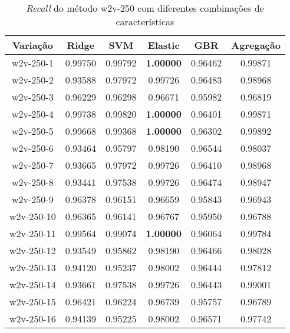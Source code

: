 \begin{table}[H]
\label{tab:recallw2v250}
\centering
\begin{tabular}{|c| c c  c  c  c| }
\hline
Variação &  Ridge & SVM & Elastic & GBR & Agregação  \\ 
\hline
w2v-250-1 & 0.99750 & 0.99792 & \textbf{1.00000} & 0.96462 & 0.99871 \\
\hline
w2v-250-2 & 0.93588 & 0.97972 & 0.99726 & 0.96483 & 0.98968 \\
\hline
w2v-250-3 & 0.96229 & 0.96298 & 0.96671 & 0.95982 & 0.96819 \\
\hline
w2v-250-4 & 0.99738 & 0.99820 & \textbf{1.00000} & 0.96401 & 0.99871 \\
\hline
w2v-250-5 & 0.99668 & 0.99368 & \textbf{1.00000} & 0.96302 & 0.99892 \\
\hline
w2v-250-6 & 0.93464 & 0.95797 & 0.98190 & 0.96544 & 0.98037 \\
\hline
w2v-250-7 & 0.93665 & 0.97972 & 0.99726 & 0.96410 & 0.98968 \\
\hline
w2v-250-8 & 0.93441 & 0.97538 & 0.99726 & 0.96474 & 0.98947 \\
\hline
w2v-250-9 & 0.96378 & 0.96151 & 0.96659 & 0.95843 & 0.96943 \\
\hline
w2v-250-10 & 0.96365 & 0.96141 & 0.96767 & 0.95950 & 0.96788 \\
\hline
w2v-250-11 & 0.99564 & 0.99074 & \textbf{1.00000} & 0.96064 & 0.99784 \\
\hline
w2v-250-12 & 0.93549 & 0.95862 & 0.98190 & 0.96466 & 0.98028 \\
\hline
w2v-250-13 & 0.94120 & 0.95237 & 0.98002 & 0.96444 & 0.97812 \\
\hline
w2v-250-14 & 0.93661 & 0.97538 & 0.99726 & 0.96443 & 0.99001 \\
\hline
w2v-250-15 & 0.96421 & 0.96224 & 0.96739 & 0.95757 & 0.96789 \\
\hline
w2v-250-16 & 0.94139 & 0.95225 & 0.98002 & 0.96571 & 0.97742 \\
\hline
\end{tabular}
\caption{\textit{Recall} do método w2v-250 com diferentes combinações de características}
\end{table}


